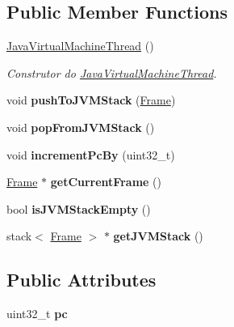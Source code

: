 \subsection*{Public Member Functions}
\begin{DoxyCompactItemize}
\item 
\hyperlink{classJavaVirtualMachineThread_ac478c8af0d1f18465bbd79d30f0ce285}{Java\+Virtual\+Machine\+Thread} ()
\begin{DoxyCompactList}\small\item\em Construtor do \hyperlink{classJavaVirtualMachineThread}{Java\+Virtual\+Machine\+Thread}. \end{DoxyCompactList}\item 
void {\bfseries push\+To\+J\+V\+M\+Stack} (\hyperlink{classFrame}{Frame})\hypertarget{classJavaVirtualMachineThread_a347d58ff764721a09d5f9c50ec0bd573}{}\label{classJavaVirtualMachineThread_a347d58ff764721a09d5f9c50ec0bd573}

\item 
void {\bfseries pop\+From\+J\+V\+M\+Stack} ()\hypertarget{classJavaVirtualMachineThread_a9877108f62d4995127f187e815e0ca84}{}\label{classJavaVirtualMachineThread_a9877108f62d4995127f187e815e0ca84}

\item 
void {\bfseries increment\+Pc\+By} (uint32\+\_\+t)\hypertarget{classJavaVirtualMachineThread_a7df1718d6d280a11c0f062be621fa84c}{}\label{classJavaVirtualMachineThread_a7df1718d6d280a11c0f062be621fa84c}

\item 
\hyperlink{classFrame}{Frame} $\ast$ {\bfseries get\+Current\+Frame} ()\hypertarget{classJavaVirtualMachineThread_acae06bccf2884756745e3aa8c8623f94}{}\label{classJavaVirtualMachineThread_acae06bccf2884756745e3aa8c8623f94}

\item 
bool {\bfseries is\+J\+V\+M\+Stack\+Empty} ()\hypertarget{classJavaVirtualMachineThread_afbf9ff18f47dc417a56cf68f64996aaa}{}\label{classJavaVirtualMachineThread_afbf9ff18f47dc417a56cf68f64996aaa}

\item 
stack$<$ \hyperlink{classFrame}{Frame} $>$ $\ast$ {\bfseries get\+J\+V\+M\+Stack} ()\hypertarget{classJavaVirtualMachineThread_a24d9e850f5e41885d944db2d0040b91b}{}\label{classJavaVirtualMachineThread_a24d9e850f5e41885d944db2d0040b91b}

\end{DoxyCompactItemize}
\subsection*{Public Attributes}
\begin{DoxyCompactItemize}
\item 
uint32\+\_\+t {\bfseries pc}\hypertarget{classJavaVirtualMachineThread_a7edbe3bde50a20b98efed231dfafc2e3}{}\label{classJavaVirtualMachineThread_a7edbe3bde50a20b98efed231dfafc2e3}

\end{DoxyCompactItemize}


